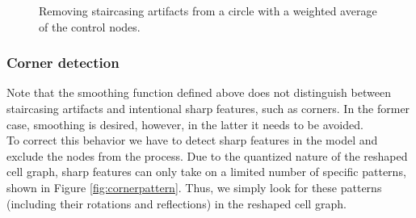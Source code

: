 \documentclass[]{usiinfbachelorproject}
\begin{document}
\begin{figure}[ht]
	\centering
	\caption{Removing staircasing artifacts from a circle with a weighted average of the control nodes.}
	\label{fig:smoothen}
\end{figure}

\subsubsection{Corner detection} \label{sec:corner}

Note that the smoothing function defined above does not distinguish between staircasing artifacts and intentional sharp features, such as corners. In the former case, smoothing is desired, however, in the latter it needs to be avoided. \\
To correct this behavior we have to detect sharp features in the model and exclude the nodes from the process. Due to the quantized nature of the reshaped cell graph, sharp features can only take on a limited number of specific patterns, shown in Figure \ref{fig:cornerpattern}. Thus, we simply look for these patterns (including their rotations and reflections) in the reshaped cell graph.
\end{document}
